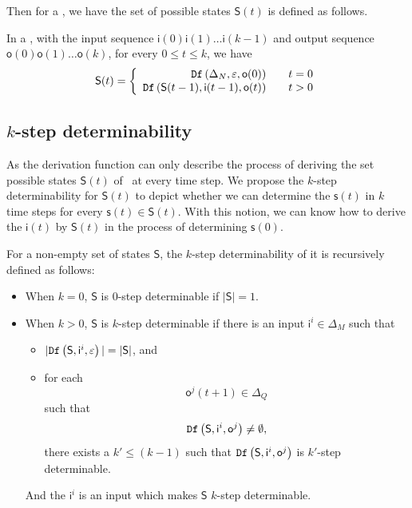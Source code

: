  Then for a \BCN, we have the set of possible states $\mathsf{S}(t)$ is defined as follows.
 \begin{definition}[$\mathsf{S}(t)$] In a \BCN, with the input sequence $\mathsf{i}(0)\mathsf{i}(1)\ldots\mathsf{i}(k-1)$ and output sequence $\mathsf{o}(0)\mathsf{o}(1)\ldots\mathsf{o}(k)$, for every $0\le t\le k$, we have
	\[\mathsf{S}(t)=\left\{
\begin{array}{rcl}
{\tt Df}\left(\Delta_N,\varepsilon,\mathsf{o}(0)\right)      &      & {t=0}\\
{\tt Df}\left(\mathsf{S}(t-1),\mathsf{i}(t-1),\mathsf{o}(t)\right)       &      & {t>0}
\end{array} \right. \]

\end{definition}
 
 
\subsection{$k$-step determinability}
As the derivation function can only describe the process of deriving the set possible states $\mathsf{S}(t)$ of \BCNs\ at every time step.  We propose the $k$-step determinability for $\mathsf{S}(t)$ to depict whether we can determine the $\mathsf{s}(t)$ in $k$ time steps for every $\mathsf{s}(t)\in \mathsf{S}(t)$. With this notion, we can know how to derive the $\mathsf{i}(t)$ by $\mathsf{S}(t)$ in the process of determining $\mathsf{s}(0)$. 
\begin{definition} 
For a non-empty  set of states $\mathsf{S}$, the $k$-step determinability of it is recursively defined as follows:
 \begin{itemize}
 \item When $k=0$, $\mathsf{S}$ is $0$-step determinable if $|\mathsf{S}|=1$. 
 \item When $k>0$, $\mathsf{S}$ is $k$-step determinable
 if there is an input $\mathsf{i}^{i} \in \Delta_M$ such that
 \begin{itemize}
 \item  $|{\tt Df}\left(\mathsf{S},\mathsf{i}^{i},\varepsilon\right)|=|\mathsf{S}|$, and 
 \item  for each \[\mathsf{o}^{j}(t+1)\in \Delta_Q\] such that \[{\tt Df}\left(\mathsf{S},\mathsf{i}^{i},\mathsf{o}^{j}\right)\neq \emptyset,\] there exists a ${k'}\le 
(k-1)$ such that ${\tt Df}\left(\mathsf{S},\mathsf{i}^{i},\mathsf{o}^{j}\right)$ is $k'$-step determinable.
 \end{itemize}
 And the $\mathsf{i}^{i}$ is an input which makes $\mathsf{S}$ $k$-step determinable.
 \end{itemize}
\end{definition}

